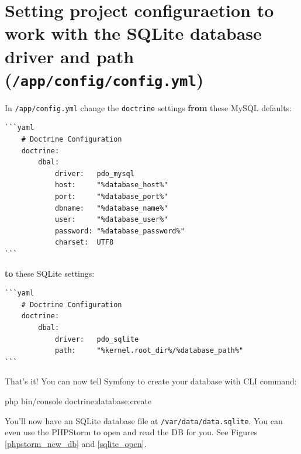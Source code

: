 \documentclass[a4paperpaper,openright]{book}
\newenvironment{Shaded}{}{}
\newcommand{\ExtensionTok}[1]{#1}
\newcommand{\NormalTok}[1]{#1}
\begin{document}
\hypertarget{setting-project-configuraetion-to-work-with-the-sqlite-database-driver-and-path-appconfigconfig.yml}{%
\section{\texorpdfstring{Setting project configuraetion to work with the
SQLite database driver and path
(\texttt{/app/config/config.yml})}{Setting project configuraetion to work with the SQLite database driver and path (/app/config/config.yml)}}\label{setting-project-configuraetion-to-work-with-the-sqlite-database-driver-and-path-appconfigconfig.yml}}

In \texttt{/app/config.yml} change the \texttt{doctrine} settings
\textbf{from} these MySQL defaults:

\begin{verbatim}
```yaml
    # Doctrine Configuration
    doctrine:
        dbal:
            driver:   pdo_mysql
            host:     "%database_host%"
            port:     "%database_port%"
            dbname:   "%database_name%"
            user:     "%database_user%"
            password: "%database_password%"
            charset:  UTF8
```
\end{verbatim}

\textbf{to} these SQLite settings:

\begin{verbatim}
```yaml
    # Doctrine Configuration
    doctrine:
        dbal:
            driver:   pdo_sqlite
            path:     "%kernel.root_dir%/%database_path%"
```
\end{verbatim}

That's it! You can now tell Symfony to create your database with CLI
command:

\begin{Shaded}
\begin{Highlighting}[]
    \ExtensionTok{php}\NormalTok{ bin/console doctrine:database:create}
\end{Highlighting}
\end{Shaded}

You'll now have an SQLite database file at
\texttt{/var/data/data.sqlite}. You can even use the PHPStorm to open
and read the DB for you. See Figures \ref{phpstorm_new_db} and
\ref{sqlite_open}.
\end{document}
